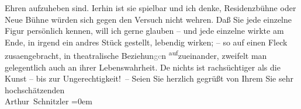 \begin{ledgroupsized}[t]{13cm}
               Ehren aufzuheben sind. I{\geminationm}erhin ist sie spielbar und ich
               denke, Residenzbühne oder Neue Bühne würden sich gegen den Versuch nicht wehren. Daß Sie
               jede einzelne Figur persönlich kennen, {\pb}will ich gerne
               glauben – und jede einzelne wirkte am Ende, in irgend ein andres Stück gestellt,
               lebendig wirken; – so auf einen Fleck zusa{\geminationm}engebracht,
               in theatralische Beziehun\textcolor{gray}{ge}n \substVorne{}\textsuperscript{auf}\substDazwischen{}zu\substHinten{}einander, zweifelt man gelegentlich auch an ihrer Lebenswahrheit. De{\geminationn} nichts ist rachsüchtiger als die Kunst – bis zur
               Ungerechtigkeit! –\pend
           \pstart
           Seien Sie herzlich gegrüßt von Ihrem Sie sehr hochschätzenden{\\[\baselineskip]}\spacefill\mbox{Arthur Schnitzler}\pend
           \leftskip=0em{}
         
         \endnumbering{}\end{ledgroupsized}  \newcommand{\dateiname}{L02213}\newcommand{\titel}{Arthur Schnitzler an Robert Adam, 11. 7. 1915}\newcommand{\editorInnen}{Martin Anton Müller und Gerd-Hermann Susen}
      